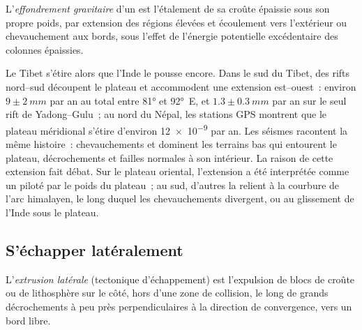 \begin{definition}\label{def:b2:himalaya-andes:collapse}
L'\emph{effondrement gravitaire}
d'un  est l'étalement de sa croûte épaissie sous son propre poids, par
extension des régions élevées et écoulement vers l'extérieur ou chevauchement aux
bords, sous l'effet de l'énergie potentielle excédentaire des colonnes épaissies.
\end{definition}

Le Tibet s'étire alors que l'Inde le pousse encore. Dans le sud du Tibet, des rifts nord--sud découpent
le plateau et accommodent une extension est--ouest~: environ $9 \pm \qty{2}{mm}$ par an au total
entre \ang{81} et \ang{92}~E, et $1.3 \pm \qty{0.3}{mm}$ par an sur le seul rift de Yadong--Gulu~; au
nord du Népal, les stations GPS montrent que le plateau méridional s'étire d'environ \num{12e-9} par
an. Les séismes racontent la même histoire~: chevauchements et  dominent les
terrains bas qui entourent le plateau, décrochements et failles normales à son intérieur. La raison
de cette extension fait débat. Sur le plateau oriental, l'extension a été interprétée comme un  piloté par le poids du plateau~; au sud, d'autres la relient à la courbure de l'arc
himalayen, le long duquel les chevauchements divergent, ou au glissement de l'Inde sous le plateau.

\subsection{S'échapper latéralement}

\begin{definition}\label{def:b2:himalaya-andes:extrusion}
L'\emph{extrusion latérale} (tectonique d'échappement) est l'expulsion
de blocs de croûte ou de lithosphère sur le côté, hors d'une zone de collision, le long de grands
décrochements à peu près perpendiculaires à la direction de convergence, vers un bord libre.
\end{definition}

